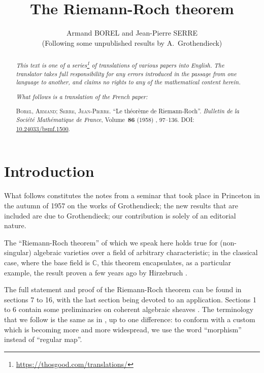 \documentclass{article}
\title{The Riemann-Roch theorem}
\author{Armand BOREL and Jean-Pierre SERRE\\(Following some unpublished results by A.~Grothendieck)}
\date{}
\theoremstyle{plain}
\theoremstyle{definition}
\newcommand{\oldpage}[1]{\marginpar{\footnotesize$\Big\vert$ \textit{p.~#1}}}
\begin{document}
\maketitle
\thispagestyle{fancy}

\renewcommand{\abstractname}{Translator's note.}

\begin{abstract}
  \renewcommand*{\thefootnote}{\fnsymbol{footnote}}
  \emph{This text is one of a series\footnote{\url{https://thosgood.com/translations/}} of translations of various papers into English.}
  \emph{The translator takes full responsibility for any errors introduced in the passage from one language to another, and claims no rights to any of the mathematical content herein.}

  \medskip
  
  \emph{What follows is a translation of the French paper:}

  \medskip\noindent
  \textsc{Borel, Armand}; \textsc{Serre, Jean-Pierre}.
  ``Le th\'{e}or\`{e}me de Riemann-Roch''.
  \emph{Bulletin de la Soci\'{e}t\'{e} Math\'{e}matique de France}, Volume~\textbf{86} (1958) , 97--136.
  \textsc{DOI}: \href{https://www.doi.org/10.24033/bsmf.1500}{10.24033/bsmf.1500}.
\end{abstract}

\setcounter{footnote}{0}

\tableofcontents



\section*{Introduction}

\oldpage{97}
What follows constitutes the notes from a seminar that took place in Princeton in the autumn of 1957 on the works of Grothendieck;
the new results that are included are due to Grothendieck;
our contribution is solely of an editorial nature.

The ``Riemann-Roch theorem'' of which we speak here holds true for (non-singular) algebraic varieties over a field of arbitrary characteristic;
in the classical case, where the base field is $\mathbb{C}$, this theorem encapsulates, as a particular example, the result proven a few years ago by Hirzebruch \cite{9}.

The full statement and proof of the Riemann-Roch theorem can be found in sections 7 to 16, with the last section being devoted to an application.
Sections 1 to 6 contain some preliminaries on coherent algebraic sheaves \cite{12}.
The terminology that we follow is the same as in \cite{12}, up to one difference: to conform with a custom which is becoming more and more widespread, we use the word ``morphism'' instead of ``regular map''.
\end{document}
